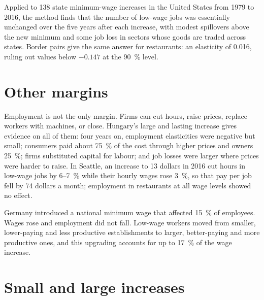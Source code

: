 Applied to 138 state minimum-wage increases in the United States from 1979 to 2016,
the method finds that the number of low-wage jobs was essentially unchanged over the
five years after each increase, with modest spillovers above the new minimum and
some job loss in sectors whose goods are traded across states. %
Border pairs give the same answer for restaurants: an elasticity of 0.016, ruling out
values below $-0.147$ at the 90~\% level. %

\section{Other margins}\label{sec:b3:minimum-wage:margins}

Employment is not the only margin. Firms can cut hours, raise prices, replace
workers with machines, or close. Hungary's large and lasting increase gives
evidence on all of them: four years on, employment elasticities were negative but
small; consumers paid about 75~\% of the cost through higher prices and owners 25~\%; firms
substituted capital for labour; and job losses were larger where prices were harder
to raise. %
In Seattle, an increase to 13 dollars in 2016 cut hours in low-wage jobs by 6--7~\% while
their hourly wages rose 3~\%, so that pay per job fell by 74 dollars a month; employment
in restaurants at all wage levels showed no effect. %

\begin{record}
Germany introduced a national minimum wage that affected 15~\% of employees. Wages rose
and employment did not fall. Low-wage workers moved from smaller, lower-paying and
less productive establishments to larger, better-paying and more productive ones,
and this upgrading accounts for up to 17~\% of the wage increase. %
\end{record}

\section{Small and large increases}\label{sec:b3:minimum-wage:size}

